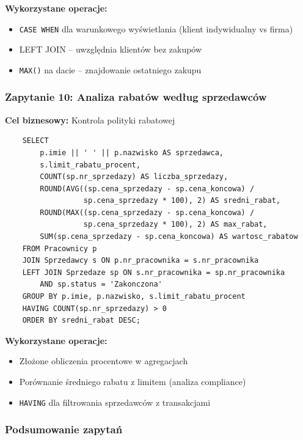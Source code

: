 \documentclass[a4paper,titleauthor]{mwart}
\begin{document}
	\textbf{Wykorzystane operacje:}
	\begin{itemize}
		\item \texttt{CASE WHEN} dla warunkowego wyświetlania (klient indywidualny vs firma)
		\item LEFT JOIN -- uwzględnia klientów bez zakupów
		\item \texttt{MAX()} na dacie -- znajdowanie ostatniego zakupu
	\end{itemize}

	\subsubsection{Zapytanie 10: Analiza rabatów według sprzedawców}

	\textbf{Cel biznesowy:} Kontrola polityki rabatowej

	\begin{verbatim}
	SELECT 
		p.imie || ' ' || p.nazwisko AS sprzedawca,
		s.limit_rabatu_procent,
		COUNT(sp.nr_sprzedazy) AS liczba_sprzedazy,
		ROUND(AVG((sp.cena_sprzedazy - sp.cena_koncowa) / 
				  sp.cena_sprzedazy * 100), 2) AS sredni_rabat,
		ROUND(MAX((sp.cena_sprzedazy - sp.cena_koncowa) / 
				  sp.cena_sprzedazy * 100), 2) AS max_rabat,
		SUM(sp.cena_sprzedazy - sp.cena_koncowa) AS wartosc_rabatow
	FROM Pracownicy p
	JOIN Sprzedawcy s ON p.nr_pracownika = s.nr_pracownika
	LEFT JOIN Sprzedaze sp ON s.nr_pracownika = sp.nr_pracownika 
		AND sp.status = 'Zakonczona'
	GROUP BY p.imie, p.nazwisko, s.limit_rabatu_procent
	HAVING COUNT(sp.nr_sprzedazy) > 0
	ORDER BY sredni_rabat DESC;
	\end{verbatim}

	\textbf{Wykorzystane operacje:}
	\begin{itemize}
		\item Złożone obliczenia procentowe w agregacjach
		\item Porównanie średniego rabatu z limitem (analiza compliance)
		\item \texttt{HAVING} dla filtrowania sprzedawców z transakcjami
	\end{itemize}

	\subsubsection{Podsumowanie zapytań}
\end{document}
